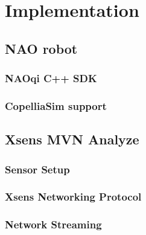 \chapter{Implementation}

\section{NAO robot}

\subsection{NAOqi C++ SDK}
\subsection{CopelliaSim support}

\section{Xsens MVN Analyze}
\subsection{Sensor Setup}
\subsection{Xsens Networking Protocol}
\subsection{Network Streaming}
